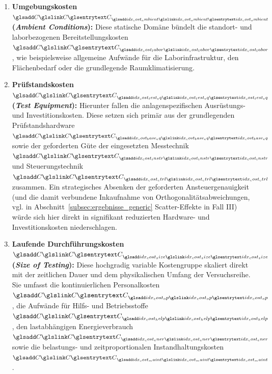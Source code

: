 \begin{enumerate}
    \item \textbf{Umgebungskosten $\sym{C}_{\sym{idx_cost_ambient}}$ (\textit{Ambient Conditions}):} Diese statische Domäne bündelt die standort- und laborbezogenen Bereitstellungskosten $\sym{C}_{\sym{idx_cost_labor}}$, wie beispielsweise allgemeine Aufwände für die Laborinfrastruktur, den Flächenbedarf oder die grundlegende Raumklimatisierung.
    \item \textbf{Prüfstandskosten $\sym{C}_{\sym{idx_cost_test_eq}}$ (\textit{Test Equipment}):} Hierunter fallen die anlagenspezifischen Ausrüstungs- und Investitionskosten.
          Diese setzen sich primär aus der grundlegenden Prüfstandshardware $\sym{C}_{\sym{idx_cost_base_eq}}$ sowie der geforderten Güte der eingesetzten Messtechnik $\sym{C}_{\sym{idx_cost_instr}}$ und Steuerungstechnik $\sym{C}_{\sym{idx_cost_ctrl}}$ zusammen.
          Ein strategisches Absenken der geforderten Ansteuergenauigkeit (und die damit verbundene Inkaufnahme von Orthogonalitätsabweichungen, vgl. in Abschnitt~\ref{subsec:ergebnisse_generic} Scatter-Effekte in Fall III) würde sich hier direkt in signifikant reduzierten Hardware- und Investitionskosten niederschlagen.
    \item \textbf{Laufende Durchführungskosten $\sym{C}_{\sym{idx_cost_size}}$ (\textit{Size of Testing}):} Diese hochgradig variable Kostengruppe skaliert direkt mit der zeitlichen Dauer und dem physikalischen Umfang der Versuchsreihe.
          Sie umfasst die kontinuierlichen Personalkosten $\sym{C}_{\sym{idx_cost_op}}$, die Aufwände für Hilfs- und Betriebsstoffe $\sym{C}_{\sym{idx_cost_help}}$, den lastabhängigen Energieverbrauch $\sym{C}_{\sym{idx_cost_ener}}$ sowie die belastungs- und zeitproportionalen Instandhaltungskosten $\sym{C}_{\sym{idx_cost_maint}}$.
\end{enumerate}

